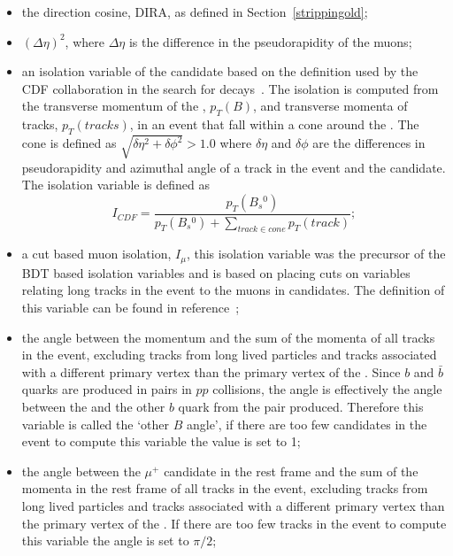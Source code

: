 \begin{itemize}
\item the direction cosine, DIRA, as defined in Section~\ref{strippingold};
\item $(\Delta \eta)^{2}$, where $\Delta \eta$ is the difference in the pseudorapidity of the muons;
\item an isolation variable of the \bs candidate based on the definition used by the CDF collaboration in the search for \bmumu decays~\cite{Abulencia:2005pw}. The isolation is computed from the transverse momentum of the \bs, $p_{T}(B)$, and transverse momenta of tracks, $p_{T}(tracks)$, in an event that fall within a cone around the \bs. The cone is defined as $\sqrt{\delta \eta^{2} + \delta \phi^{2}} > 1.0$ where $\delta \eta$ and $\delta \phi$ are the differences in pseudorapidity and azimuthal angle of a track in the event and the \bs candidate. The isolation variable is defined as 
\begin{equation}
I_{CDF} = \frac{p_{T}(B_{s}{^0})}{p_{T}(B_{s}{^0}) + \displaystyle\sum_{track \in cone}p_{T}(track) };
\end{equation}
\item a cut based muon isolation, $I_{\mu}$, this isolation variable was the precursor of the BDT based isolation variables and is based on placing cuts on variables relating long tracks in the event to the muons in \bsmumu candidates. The definition of this variable can be found in reference~\cite{Morda:2120795};
\item the angle between the \bs momentum and the sum of the momenta of all tracks in the event, excluding tracks from long lived particles and tracks associated with a different primary vertex than the primary vertex of the \bs. Since $b$ and $\bar{b}$ quarks are produced in pairs in $pp$ collisions, the angle is effectively the angle between the \bs and the other $b$ quark from the pair produced. Therefore this variable is called the `other $B$ angle', if there are too few candidates in the event to compute this variable the value is set to 1; %
\item the angle between the $\mu^+$ candidate in the \bs rest frame and the sum of the momenta in the \bs rest frame of all tracks in the event, excluding tracks from long lived particles and tracks associated with a different primary vertex than the primary vertex of the \bs. If there are too few tracks in the event to compute this variable the angle is set to $\pi/2$;%

\end{itemize}
